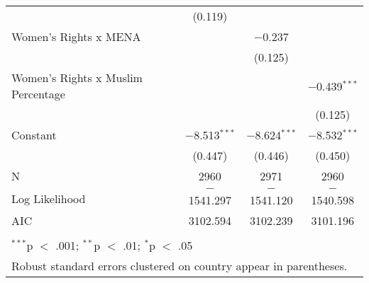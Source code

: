 \begin{table}[!htbp]
\begin{tabular}{@{\extracolsep{5pt}}lccc}
  & (0.119) &  &  \\ 
  Women's Rights x MENA &  & $-$0.237 &  \\ 
  &  & (0.125) &  \\ 
  Women's Rights x Muslim Percentage &  &  & $-$0.439$^{***}$ \\ 
  &  &  & (0.125) \\ 
  Constant & $-$8.513$^{***}$ & $-$8.624$^{***}$ & $-$8.532$^{***}$ \\ 
  & (0.447) & (0.446) & (0.450) \\ 
 N & 2960 & 2971 & 2960 \\ 
Log Likelihood & $-$1541.297 & $-$1541.120 & $-$1540.598 \\ 
AIC & 3102.594 & 3102.239 & 3101.196 \\ 
\hline \\[-1.8ex] 
\multicolumn{4}{l}{$^{***}$p $<$ .001; $^{**}$p $<$ .01; $^{*}$p $<$ .05} \\ 
\multicolumn{4}{l}{Robust standard errors clustered on country appear in parentheses.} \\ 
\end{tabular} 
\end{table} 
